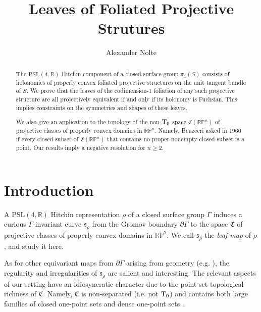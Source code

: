 \documentclass[12pt,a4paper]{amsart}
\newcommand{\RP}{\mathbb R \mathbb P}
\theoremstyle{definition}
\theoremstyle{plain}
\numberwithin{equation}{section}
\begin{document}
\title{Leaves of Foliated Projective Strutures}
\author{Alexander Nolte}
\address{Rice University, Houston TX, USA}
\maketitle

\begin{abstract}
The $\text{PSL}(4,\mathbb{R})$ Hitchin component of a closed surface group $\pi_1(S)$ consists of holonomies of properly convex foliated projective structures on the unit tangent bundle of $S$. We prove that the leaves of the codimension-$1$ foliation of any such projective structure are all projectively equivalent if and only if its holonomy is Fuchsian. This implies constraints on the symmetries and shapes of these leaves.

We also give an application to the topology of the non-${\rm T}_0$ space $\mathfrak{C}(\RP^n)$ of projective classes of properly convex domains in $\RP^n$. Namely, Benz\'ecri asked in 1960 if every closed subset of $\mathfrak{C}(\RP^n)$ that contains no proper nonempty closed subset is a point. Our results imply a negative resolution for $n \geq 2$. 
\end{abstract}

\section{Introduction}

A $\text{PSL}(4,\mathbb{R})$ Hitchin representation $\rho$ of a closed surface group $\Gamma$ induces a curious $\Gamma$-invariant curve $\mathfrak{s}_\rho$ from the Gromov boundary $\partial \Gamma$ to the space $\mathfrak{C}$ of projective classes of properly convex domains in $\RP^2$. We call $\mathfrak{s}_\rho$ the \textit{leaf map} of $\rho$, and study it here.

As for other equivariant maps from $\partial \Gamma$ arising from geometry (e.g. \cite{benoist2004convexesI} \cite{bowen1979hausdorff} \cite{brigeman2022hessian} \cite{cannon2007group} \cite{guichard2005regularity} \cite{potrie2017eigenvalues-entropy}), the regularity and irregularities of $\mathfrak{s}_\rho$ are salient and interesting. The relevant aspects of our setting have an idiosyncratic character due to the point-set topological richness of $\mathfrak{C}$. Namely, $\mathfrak{C}$ is non-separated (i.e. not ${\rm T}_0$) and contains both large families of closed one-point sets and dense one-point sets \cite{benzecri1960thesis} \cite{goldman1990convex} \cite{kacVinberg1967quasihomogeneous}.
\end{document}
